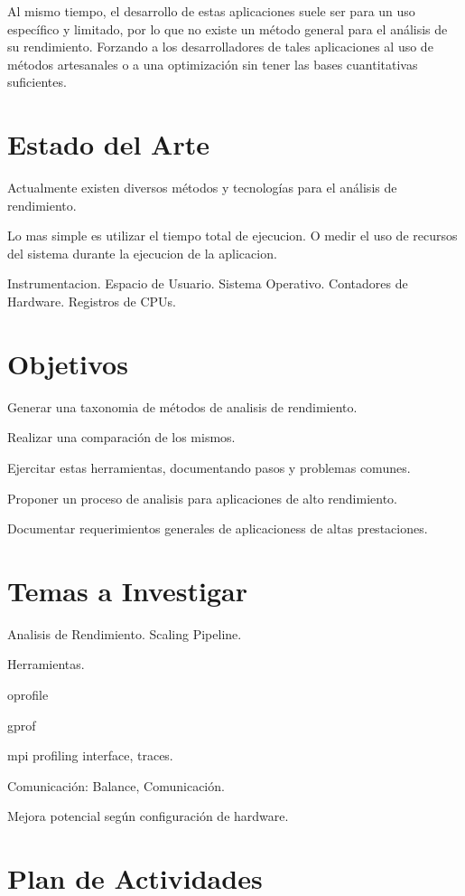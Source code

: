 \documentclass[a4paper,twocolumn]{article}
\begin{document}
Al mismo tiempo, el desarrollo de estas aplicaciones suele ser para un uso espec\'ifico y limitado, por lo que no existe un m\'etodo general para el an\'alisis de su rendimiento. Forzando a los desarrolladores de tales aplicaciones al uso de m\'etodos artesanales o a una optimizaci\'on sin tener las bases cuantitativas suficientes.

\section{Estado del Arte}

Actualmente existen diversos m\'etodos y tecnolog\'ias para el an\'alisis de rendimiento.

Lo mas simple es utilizar el tiempo total de ejecucion. O medir el uso de recursos del sistema durante la ejecucion de la aplicacion.

Instrumentacion.
Espacio de Usuario.
Sistema Operativo.
Contadores de Hardware. Registros de CPUs.

\section{Objetivos}

Generar una taxonomia de m\'etodos de analisis de rendimiento.

Realizar una comparaci\'on de los mismos.

Ejercitar estas herramientas, documentando pasos y problemas comunes.

Proponer un proceso de analisis para aplicaciones de alto rendimiento.

Documentar requerimientos generales de aplicacioness de altas prestaciones.

\section{Temas a Investigar}

Analisis de Rendimiento.
Scaling
Pipeline.

Herramientas.

oprofile \cite{oprofile}

gprof \cite{gprof}

mpi profiling interface, traces. \cite{mpi}

Comunicaci\'on: Balance, Comunicaci\'on.

Mejora potencial seg\'un configuraci\'on de hardware.

\section{Plan de Actividades}
\end{document}
